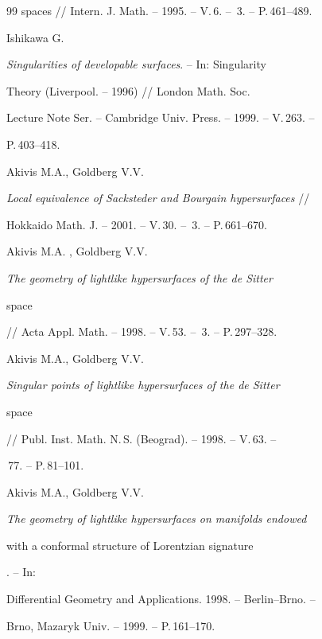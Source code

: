 \begin{thebibliography}{99}
{spaces} // Intern. J. Math. -- 1995. -- V.\,6. -- \No\,3. -- P.\,461--489.







Ishikawa G.


{\em Singularities of developable surfaces}. -- In: Singularity


Theory (Liverpool. -- 1996) // London Math. Soc.


Lecture Note Ser. -- Cambridge Univ. Press. -- 1999. -- V.\,263. -- 


P.\,403--418.







Akivis M.A., Goldberg V.V.


{\em Local equivalence of Sacksteder and Bourgain hypersurfaces} //


Hokkaido Math. J. -- 2001. -- V.\,30. -- \No\,3. -- P.\,661--670.







Akivis M.A. , Goldberg V.V.


{\em The geometry of lightlike hypersurfaces of the de Sitter


space} // Acta Appl. Math. -- 1998. -- V.\,53. -- \No\,3. -- P.\,297--328.







Akivis M.A., Goldberg V.V.


{\em Singular points of lightlike hypersurfaces of the de Sitter


space} // Publ. Inst. Math. N.\,S. (Beograd). -- 1998. -- V.\,63. --


\No\,77. -- P.\,81--101.







Akivis M.A., Goldberg V.V.


{\em The geometry of lightlike hypersurfaces on manifolds endowed


with a conformal structure of Lorentzian signature}. -- In: 


Differential Geometry and Applications. 1998. -- Berlin--Brno. --


Brno, Mazaryk Univ. -- 1999. -- P.\,161--170.






\end{thebibliography}
